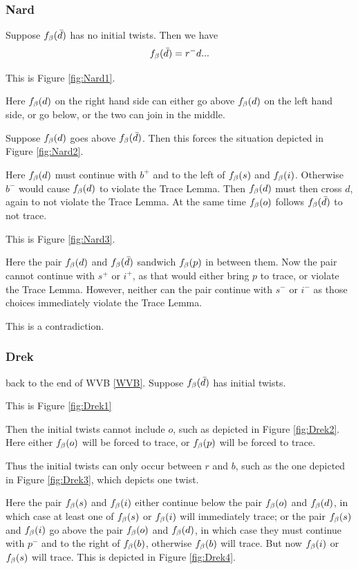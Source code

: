 \subsubsection{Nard}\label{Nard}
Suppose $f_\beta(\bar{d})$ has no initial twists. Then we have
\[
f_\beta(\bar{d}) = r^- d...
\]

This is Figure \ref{fig:Nard1}.

Here $f_\beta(d)$ on the right hand side can either go above $f_\beta(d)$ on the left hand side, or go below, or the two can join in the middle.

Suppose $f_\beta(d)$ goes above $f_\beta(\bar{d})$. Then this forces the situation depicted in Figure \ref{fig:Nard2}.

Here $f_\beta(d)$ must continue with $b^+$ and to the left of $f_\beta(s)$ and $f_\beta(i)$. Otherwise $b^-$ would cause $f_\beta(d)$ to violate the Trace Lemma. Then $f_\beta(d)$ must then cross $d$, again to not violate the Trace Lemma. At the same time $f_\beta(o)$ follows $f_\beta(\bar{d})$ to not trace.

This is Figure \ref{fig:Nard3}.

Here the pair $f_\beta(d)$ and $f_\beta(\bar{d})$ sandwich $f_\beta(p)$ in between them. Now the pair cannot continue with $s^+$ or $i^+$, as that would either bring $p$ to trace, or violate the Trace Lemma. However, neither can the pair continue with $s^-$ or $i^-$ as those choices immediately violate the Trace Lemma. 

This is a contradiction.


\subsubsection{Drek}\label{Drek}
back to the end of WVB \ref{WVB}. Suppose $f_\beta(\bar{d})$ has initial twists. 

This is Figure \ref{fig:Drek1}

Then the initial twists cannot include $o$, such as depicted in Figure \ref{fig:Drek2}. Here either $f_\beta(o)$ will be forced to trace, or $f_\beta(p)$ will be forced to trace.

Thus the initial twists can only occur between $r$ and $b$, such as the one depicted in Figure \ref{fig:Drek3}, which depicts one twist.

Here the pair $f_\beta(s)$ and $f_\beta(i)$ either continue below the pair $f_\beta(o)$ and $f_\beta(d)$, in which case at least one of $f_\beta(s)$ or $f_\beta(i)$ will immediately trace; or the pair $f_\beta(s)$ and $f_\beta(i)$ go above the pair $f_\beta(o)$ and $f_\beta(d)$, in which case they must continue with $p^-$ and to the right of $f_\beta(b)$, otherwise $f_\beta(b)$ will trace. But now $f_\beta(i)$ or $f_\beta(s)$ will trace. This is depicted in Figure \ref{fig:Drek4}.

